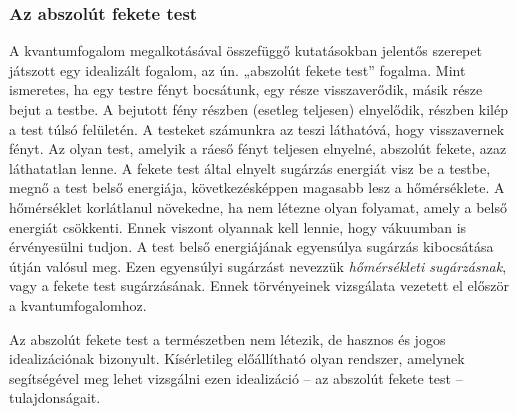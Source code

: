 \documentclass[../main.tex]{subfiles}
\begin{document}
\subsubsection{Az abszolút fekete test}
A kvantumfogalom megalkotásával összefüggő kutatásokban jelentős szerepet játszott egy idealizált fogalom, az ún. „abszolút fekete test” fogalma. Mint ismeretes, ha egy testre fényt bocsátunk, egy része visszaverődik, másik része bejut a testbe. A bejutott fény részben (esetleg teljesen) elnyelődik, részben kilép a test túlsó felületén.
A testeket számunkra az teszi láthatóvá, hogy visszavernek fényt. Az olyan test, amelyik a ráeső fényt teljesen elnyelné, abszolút fekete, azaz láthatatlan lenne. A fekete test által elnyelt sugárzás energiát visz be a testbe, megnő a test belső energiája, következésképpen magasabb lesz a hőmérséklete. A hőmérséklet korlátlanul növekedne,
ha nem létezne olyan folyamat, amely a belső energiát csökkenti. Ennek viszont olyannak kell lennie, hogy vákuumban is érvényesülni tudjon. A test belső energiájának egyensúlya sugárzás kibocsátása útján valósul meg. Ezen egyensúlyi sugárzást nevezzük \textit{hőmérsékleti sugárzásnak}, vagy a fekete test sugárzásának. Ennek törvényeinek vizsgálata vezetett el először a kvantumfogalomhoz.

Az abszolút fekete test a természetben nem létezik, de hasznos és jogos idealizációnak bizonyult. Kísérletileg előállítható olyan rendszer, amelynek segítségével meg lehet vizsgálni ezen idealizáció – az abszolút fekete test – tulajdonságait.
\end{document}

